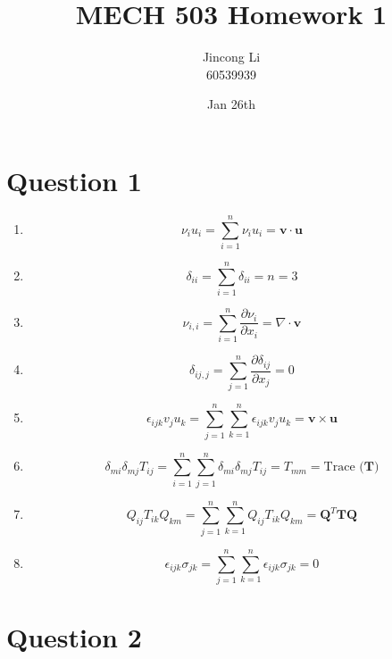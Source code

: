 \documentclass[a4paper,12pt]{article} %
\begin{document}
\newcommand{\vect}[1]{\mathbf{#1}}

\title{MECH 503 Homework 1}
\author{Jincong Li \\ 60539939}
\date{Jan 26th}
\maketitle

\section{\textbf{Question 1}}

\begin{enumerate}[label= (\alph*)]
    \item \[ \nu_i u_i = \sum_{i=1}^{n} \nu_i u_i  = \vect{v} \cdot \vect{u} \]
    
    \item \[ \delta_{ii} = \sum_{i=1}^{n} \delta_{ii} = n = 3 \]

    \item \[ \nu_{i,i} = \sum_{i=1}^{n} \frac{\partial \nu_i}{\partial x_i}  = \nabla \cdot \vect{v}\]

    \item \[ \delta_{ij,j} = \sum_{j=1}^{n} \frac{\partial \delta_{ij}}{\partial x_j} = 0\]

    \item \[ \epsilon_{ijk} v_j u_k = \sum_{j=1}^{n} \sum_{k=1}^{n} \epsilon_{ijk} v_j u_k  = \vect{v} \times  \vect{u} \]

    \item \[ \delta_{mi} \delta_{mj} T_{ij} = \sum_{i=1}^{n} \sum_{j=1}^{n} \delta_{mi} \delta_{mj} T_{ij} = T_{mm} = \text{Trace ($\vect{T}$)}\]

    \item \[ Q_{ij} T_{ik} Q_{km} = \sum_{j=1}^{n} \sum_{k=1}^{n} Q_{ij} T_{ik} Q_{km} = {\vect{Q}}^T \vect{T}\vect{Q} \]

    \item \[ \epsilon_{ijk} \sigma_{jk} = \sum_{j=1}^{n} \sum_{k=1}^{n} \epsilon_{ijk} \sigma_{jk} =0 \]
\end{enumerate}

\section{\textbf{Question 2}}
\end{document}
